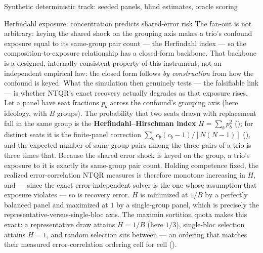 \documentclass[
  ignorenonframetext,
]{beamer}
\begin{document}
\begin{frame}{Synthetic deterministic track:
seeded panels, blind estimates, oracle scoring}
\begin{block}{Herfindahl exposure: concentration predicts shared-error
risk}
\protect{}\label{herfindahl-exposure-concentration-predicts-shared-error-risk}
The fan-out is not arbitrary: keying the shared shock on the grouping
axis makes a trio's confound exposure equal to its same-group pair count
--- the Herfindahl index --- so the composition-to-exposure relationship
has a closed-form backbone. That backbone is a designed,
internally-consistent property of this instrument, not an independent
empirical law: the closed form follows \emph{by construction} from how
the confound is keyed. What the simulation then genuinely tests --- the
falsifiable link --- is whether NTQR's exact recovery actually degrades
as that exposure rises. Let a panel have seat fractions \(p_b\) across
the confound's grouping axis (here ideology, with \(B\) groups). The
probability that two seats drawn with replacement fall in the same group
is the \textbf{Herfindahl--Hirschman index} \(H = \sum_b p_b^2\)
(); for distinct seats it is the
finite-panel correction \(\sum_b c_b(c_b-1)/[N(N-1)]\)
(), and the expected
number of same-group pairs among the three pairs of a trio is three
times that. Because the shared error shock is keyed on the group, a
trio's exposure to it is exactly its same-group pair count. Holding
competence fixed, the realized error-correlation NTQR measures is
therefore monotone increasing in \(H\), and --- since the exact
error-independent solver is the one whose assumption that exposure
violates --- so is recovery error. \(H\) is minimized at \(1/B\) by a
perfectly balanced panel and maximized at \(1\) by a single-group panel,
which is precisely the representative-versus-single-bloc axis. The
maximin sortition quota makes this exact: a representative draw attains
\(H = 1/B\) (here \(1/3\)), single-bloc selection attains \(H = 1\), and
random selection sits between --- an ordering that matches their
measured error-correlation ordering cell for cell
().


\end{block}
\end{frame}
\end{document}
